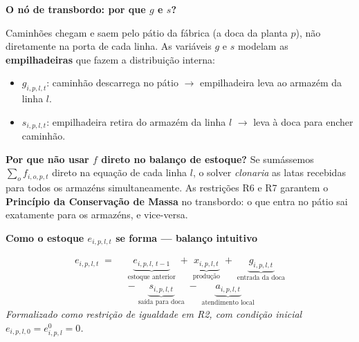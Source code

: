\documentclass[12pt, a4paper]{article}
\begin{document}
\vspace{8pt}

\begin{mdframed}[style=destaque]
  \textbf{\color{ballblue}O n\'{o} de transbordo: por que $g$ e $s$?}

  \medskip
  Caminh\~{o}es chegam e saem pelo p\'{a}tio da f\'{a}brica (a doca da planta $p$),
  n\~{a}o diretamente na porta de cada linha. As vari\'{a}veis $g$ e $s$ modelam
  as \textbf{empilhadeiras} que fazem a distribui\c{c}\~{a}o interna:

  \begin{itemize}[leftmargin=1.5em, itemsep=2pt]
    \item $g_{i,p,l,t}$: caminh\~{a}o descarrega no p\'{a}tio $\to$ empilhadeira leva ao armazém da linha $l$.
    \item $s_{i,p,l,t}$: empilhadeira retira do armazém da linha $l$ $\to$ leva \`{a} doca para encher caminh\~{a}o.
  \end{itemize}

  \medskip
  \textbf{Por que n\~{a}o usar $f$ direto no balan\c{c}o de estoque?}
  Se sum\'{a}ssemos $\sum_o f_{i,o,p,t}$ direto na equa\c{c}\~{a}o de cada linha $l$,
  o solver \textit{clonaria} as latas recebidas para todos os armazéns simultaneamente.
  As restri\c{c}\~{o}es R6 e R7 garantem o \textbf{Princ\'{i}pio da Conserva\c{c}\~{a}o de Massa}
  no transbordo: o que entra no p\'{a}tio sai exatamente para os armazéns, e vice-versa.
\end{mdframed}

\vspace{8pt}

\begin{mdframed}[style=destaque]
  \textbf{\color{ballblue}Como o estoque $e_{i,p,l,t}$ se forma --- balan\c{c}o intuitivo}

  \medskip
  \[
    \begin{aligned}
      e_{i,p,l,t} \;=\;\;
      & \underbrace{e_{i,p,l,\,t-1}}_{\text{estoque anterior}}
        \;+\; \underbrace{x_{i,p,l,t}}_{\text{produ\c{c}\~{a}o}}
        \;+\; \underbrace{g_{i,p,l,t}}_{\text{entrada da doca}} \\[10pt]
      & -\; \underbrace{s_{i,p,l,t}}_{\text{sa\'{i}da para doca}}
        \;-\; \underbrace{a_{i,p,l,t}}_{\text{atendimento local}}
    \end{aligned}
  \]
  \textit{Formalizado como restri\c{c}\~{a}o de igualdade em R2, com condi\c{c}\~{a}o inicial $e_{i,p,l,0} = e^0_{i,p,l} = 0$.}
\end{mdframed}
\end{document}

